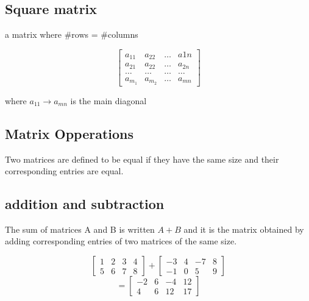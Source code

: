 \subsection{Square matrix}%
\label{sub:square_matrix}

\begin{definition}
	a matrix where \#rows = \#columns

	\[\begin{bmatrix} a_{11} & a_{22} & \ldots &a 1n \\
	a_{21} & a_{22} & \ldots & a_{2n} \\
\ldots & \ldots & \ldots & \ldots \\
a_{m_1} & a_{m_2} & \ldots & a_{mn}\end{bmatrix} \]

where $a_{11} \to a_{mn}$ is the main diagonal
\end{definition}

\subsection{Matrix Opperations}%
\label{sub:matrix_opperations}



\begin{theorem}
	Two matrices are defined to be equal if they have the same size and their corresponding entries are equal.
\end{theorem}

\subsection{addition and subtraction}%
\label{sub:addition_and_subtraction}

\begin{theorem}[]
The sum of matrices A and B is written $A + B$ and it is the matrix obtained by adding corresponding
entries of two matrices of the same size.
\end{theorem}

\begin{example}

	\[\begin{bmatrix} 1& 2 & 3&4 \\5&6&7&8 \end{bmatrix} + \begin{bmatrix} -3&4&-7&8 \\ -1& 0 & 5 & 9 \end{bmatrix}  \]
	\[= \begin{bmatrix}  -2 & 6 & -4 & 12 \\ 4 & 6 & 12 & 17 \end{bmatrix} \]
\end{example}

